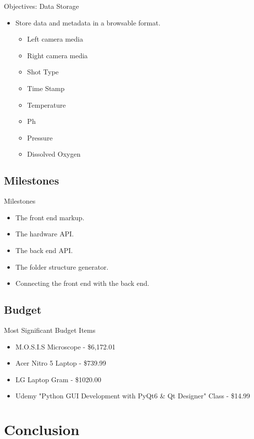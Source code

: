 \documentclass[14pt, aspectratio=169]{beamer}
\begin{document}
\begin{frame}{Objectives: Data Storage}
	\begin{itemize}
		\item Store data and metadata in a browsable format.
		      \begin{itemize}
			      \item Left camera media
			      \item Right camera media
			      \item Shot Type
			      \item Time Stamp
			      \item Temperature
			      \item Ph
			      \item Pressure
			      \item Dissolved Oxygen
		      \end{itemize}
	\end{itemize}
\end{frame}
\subsection{Milestones}
\begin{frame}{Milestones}
	\begin{itemize}
		\item The front end markup.
		\item The hardware API.
		\item The back end API.
		\item The folder structure generator.
		\item Connecting the front end with the back end.
	\end{itemize}
\end{frame}
\subsection{Budget}
\begin{frame}{Most Significant Budget Items}
	\begin{itemize}
		\item M.O.S.I.S Microscope - \$6,172.01
		\item Acer Nitro 5 Laptop - \$739.99
		\item LG Laptop Gram - \$1020.00
		\item Udemy "Python GUI Development with PyQt6 \& Qt Designer" Class - \$14.99
	\end{itemize}
\end{frame}
\section{Conclusion}
\end{document}
